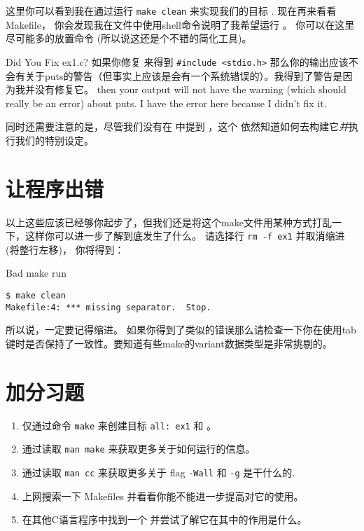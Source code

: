 这里你可以看到我在通过运行 \verb|make clean| 来实现我们的目标 .  现在再来看看 Makefile， 你会发现我在文件中使用shell命令说明了我希望运行 。 你可以在这里尽可能多的放置命令 (所以说这还是个不错的简化工具)。 

\begin{aside}{Did You Fix ex1.c?}
如果你修复  来得到 \verb|#include <stdio.h>| 那么你的输出应该不会有关于puts的警告（但事实上应该是会有一个系统错误的）。我得到了警告是因为我并没有修复它。 then your output will not have the warning (which should really be an error) about puts.  I have the error here because I didn't fix it.
\end{aside}

同时还需要注意的是，尽管我们没有在  中提到  ，这个  依然知道如何去构建它\emph{并}执行我们的特别设定。


\section{让程序出错}

以上这些应该已经够你起步了，但我们还是将这个make文件用某种方式打乱一下，这样你可以进一步了解到底发生了什么。 请选择行 \verb|rm -f ex1| 并取消缩进 (将整行左移)， 你将得到：

\begin{Terminal}{Bad make run}
\begin{lstlisting}
$ make clean
Makefile:4: *** missing separator.  Stop.
\end{lstlisting}
\end{Terminal}

所以说，一定要记得缩进。
如果你得到了类似的错误那么请检查一下你在使用tab键时是否保持了一致性。要知道有些make的variant数据类型是非常挑剔的。


\section{加分习题}

\begin{enumerate}
\item 仅通过命令 \verb|make| 来创建目标 \verb|all: ex1| 和 。
\item 通过读取 \verb|man make| 来获取更多关于如何运行的信息。
\item 通过读取 \verb|man cc| 来获取更多关于 flag \verb|-Wall| 和 \verb|-g| 是干什么的.
\item 上网搜索一下 Makefiles 并看看你能不能进一步提高对它的使用。
\item 在其他C语言程序中找到一个  并尝试了解它在其中的作用是什么。
\end{enumerate}

